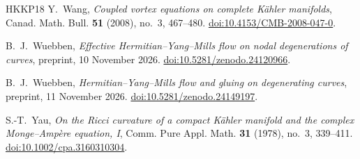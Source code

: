 \begin{thebibliography}{HKKP18}
Y.~Wang, \emph{Coupled vortex equations on complete K\"ahler manifolds},
Canad. Math. Bull. \textbf{51} (2008), no.~3, 467--480.
\href{https://doi.org/10.4153/CMB-2008-047-0}{doi:10.4153/CMB-2008-047-0}.

B.~J.~Wuebben,
\emph{Effective Hermitian--Yang--Mills flow on nodal degenerations of curves},
preprint, 10 November 2026.
\href{https://doi.org/10.5281/zenodo.24120966}{doi:10.5281/zenodo.24120966}.

B.~J.~Wuebben,
\emph{Hermitian--Yang--Mills flow and gluing on degenerating curves},
preprint, 11 November 2026.
\href{https://doi.org/10.5281/zenodo.24149197}{doi:10.5281/zenodo.24149197}.

S.-T.~Yau,
\emph{On the Ricci curvature of a compact K\"ahler manifold and the complex Monge--Amp\`ere equation, I},
Comm. Pure Appl. Math. \textbf{31} (1978), no.~3, 339--411.
\href{https://doi.org/10.1002/cpa.3160310304}{doi:10.1002/cpa.3160310304}.
\end{thebibliography}
